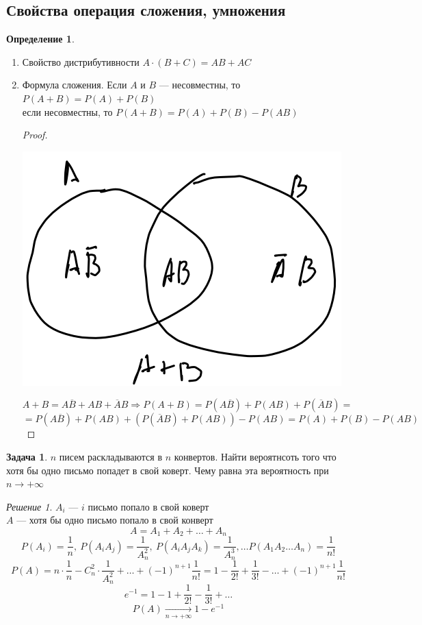 \documentclass[oneside]{book}
\theoremstyle{plain}
\theoremstyle{remark}
\newtheorem*{solution}{Решение}
\theoremstyle{definition}
\newtheorem{task}{Задача}
\newtheorem*{definition}{Определение}
\begin{document}
\subsection{Свойства операция сложения, умножения}
\label{sec:orgbba7d2b}
\begin{definition}
\-
\begin{enumerate}
\item Свойство дистрибутивности \(A\cdot (B + C) = AB + AC\)
\item Формула сложения. Если \(A\) и \(B\) --- несовместны, то \(P(A + B) = P(A) + P(B)\) \\
если несовместны, то \(P(A + B) = P(A) + P(B) - P(AB)\)
\begin{proof}
\-
\begin{center}
\includegraphics[scale=0.4]{2_2.png}
\end{center}
\[ A + B = A\overline{B} + AB + \overline{A}B \Rightarrow P(A + B) = P(A\overline{B}) + P(AB) + P(\overline{A}B) = \]
\[ = P(A\overline{B}) + P(AB) + (P(\overline{A}B) + P(AB)) - P(AB) = P(A) + P(B) - P(AB) \]
\end{proof}
\end{enumerate}
\end{definition}
\begin{task}
\(n\) писем раскладываются в \(n\) конвертов. Найти вероятнсоть того что
хотя бы одно письмо попадет в свой коверт. Чему равна эта вероятность
при \(n \to + \infty\)
\end{task}
\begin{solution}
\(A_i\) --- \(i\) письмо попало в свой коверт \\
\(A\) --- хотя бы одно письмо попало в свой конверт
\[ A = A_1 + A_2 + \dots + A_n \]
\[ P(A_i) = \frac{1}{n},\ P(A_iA_j) = \frac{1}{A^2_n},\ P(A_iA_jA_k) = \frac{1}{A^3_n}, \dots P(A_1A_2\dots A_n) = \frac{1}{n!}\]
\[ P(A) = n\cdot\frac{1}{n} - C^2_n\cdot\frac{1}{A^2_n} + \dots + (-1)^{n + 1}\frac{1}{n!} = 1 - \frac{1}{2!} + \frac{1}{3!} - \dots + (-1)^{n + 1}\frac{1}{n!} \]
\[ e^{-1} = 1 - 1 + \frac{1}{2!} - \frac{1}{3!} + \dots \]
\[ P(A) \xrightarrow[n \to +\infty]{} 1 - e^{-1} \]
\end{solution}
\end{document}
